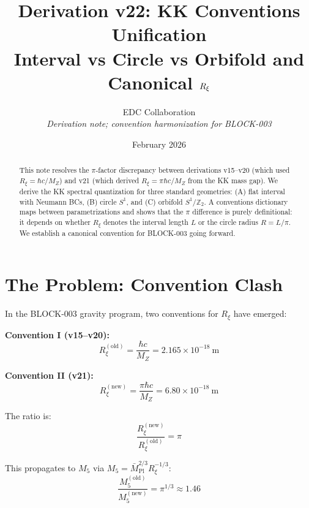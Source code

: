 \documentclass[11pt,a4paper]{article}
\title{Derivation v22: KK Conventions Unification\\
Interval vs Circle vs Orbifold and Canonical $\Rxi$}
\author{EDC Collaboration\\[3pt]
\small\textit{Derivation note; convention harmonization for BLOCK-003}}
\date{February 2026}
\newcommand{\Rxi}{R_\xi}
\newcommand{\Mplbar}{\bar{M}_{\mathrm{Pl}}}
\newcommand{\Mfive}{M_5}
\newcommand{\MZ}{M_Z}
\begin{document}
\maketitle

\begin{abstract}
This note resolves the $\pi$-factor discrepancy between derivations v15--v20
(which used $\Rxi = \hbar c/\MZ$) and v21 (which derived $\Rxi = \pi\hbar c/\MZ$
from the KK mass gap). We derive the KK spectral quantization for three standard
geometries: (A) flat interval with Neumann BCs, (B) circle $S^1$, and
(C) orbifold $S^1/\mathbb{Z}_2$. A conventions dictionary maps between
parametrizations and shows that the $\pi$ difference is purely definitional:
it depends on whether $\Rxi$ denotes the interval length $L$ or the circle
radius $R = L/\pi$. We establish a canonical convention for BLOCK-003 going forward.
\end{abstract}

\section{The Problem: Convention Clash}

In the BLOCK-003 gravity program, two conventions for $\Rxi$ have emerged:

\textbf{Convention I (v15--v20):}
\begin{equation}
\Rxi^{(\mathrm{old})} = \frac{\hbar c}{\MZ} = 2.165 \times 10^{-18}~\mathrm{m}
\label{eq:Rxi-old}
\end{equation}

\textbf{Convention II (v21):}
\begin{equation}
\Rxi^{(\mathrm{new})} = \frac{\pi \hbar c}{\MZ} = 6.80 \times 10^{-18}~\mathrm{m}
\label{eq:Rxi-new}
\end{equation}

The ratio is:
\begin{equation}
\frac{\Rxi^{(\mathrm{new})}}{\Rxi^{(\mathrm{old})}} = \pi
\label{eq:ratio-pi}
\end{equation}

This propagates to $\Mfive$ via $\Mfive = \Mplbar^{2/3}\Rxi^{-1/3}$:
\begin{equation}
\frac{\Mfive^{(\mathrm{old})}}{\Mfive^{(\mathrm{new})}} = \pi^{1/3} \approx 1.46
\label{eq:M5-ratio}
\end{equation}
\end{document}

